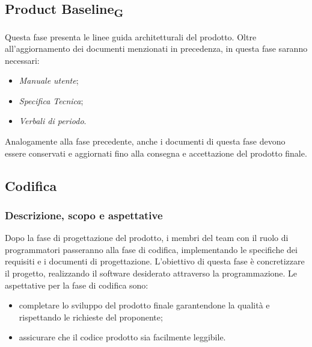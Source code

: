 \documentclass{article}
\begin{document}
\subsection*{Product Baseline\textsubscript{G}}
Questa fase presenta le linee guida architetturali del prodotto. Oltre all'aggiornamento dei documenti menzionati in precedenza, in questa fase saranno necessari:
\begin{itemize}
    \item \textit{Manuale utente};
    \item \textit{Specifica Tecnica};
    \item \textit{Verbali di periodo}.
\end{itemize}
Analogamente alla fase precedente, anche i documenti di questa fase devono essere conservati e aggiornati fino alla consegna e accettazione del prodotto finale.

\subsection{Codifica}
\subsubsection{Descrizione, scopo e aspettative}
Dopo la fase di progettazione del prodotto, i membri del team con il ruolo di programmatori passeranno alla fase di codifica, implementando le specifiche dei requisiti e i documenti di progettazione. L'obiettivo di questa fase è concretizzare il progetto, realizzando il software desiderato attraverso la programmazione. Le aspettative per la fase di codifica sono:
\begin{itemize}
    \item completare lo sviluppo del prodotto finale garantendone la qualità e rispettando le richieste del proponente;
    \item assicurare che il codice prodotto sia facilmente leggibile.
\end{itemize}
\end{document}
